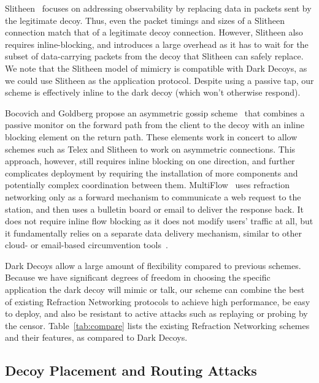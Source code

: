 Slitheen~\cite{slitheen16} focuses on addressing observability by replacing
data in packets sent by the legitimate decoy. Thus, even the packet timings and
sizes of a Slitheen connection match that of a legitimate decoy connection.
However, Slitheen also requires inline-blocking, and introduces a large overhead
as it has to wait for the subset of data-carrying packets from the decoy that
Slitheen can safely replace. We note that the Slitheen model of mimicry is
compatible with Dark Decoys, as we could use Slitheen as the application
protocol. Despite using a passive tap, our scheme is effectively inline to the
dark decoy (which won't otherwise respond).


Bocovich and Goldberg propose an asymmetric gossip scheme~\cite{secureasymmetry} that combines a passive monitor on the forward path from the client to the decoy with an inline blocking element on the return path. These elements work in concert to allow schemes such as Telex and Slitheen to work on asymmetric connections. This approach, however, still requires inline blocking on one direction, and further complicates deployment by requiring the installation of more components and potentially complex coordination between them. MultiFlow~\cite{multiflow} uses refraction networking only as a forward mechanism to communicate a web request to the station, and then uses a bulletin board or email to deliver the response back. It does not require inline flow blocking as it does not modify users' traffic at all, but it fundamentally relies on a separate data delivery mechanism, similar to other cloud- or email-based circumvention tools~\cite{SWEET-ToN,CloudTransport}.

Dark Decoys allow a large amount of flexibility compared to previous schemes.
Because we have significant degrees of freedom in choosing the specific
application the dark decoy will mimic or talk, our scheme can combine the best
of existing Refraction Networking protocols to achieve high performance, be easy
to deploy, and
also be resistant to active attacks such as replaying or probing by the censor.
Table~\ref{tab:compare} lists the existing Refraction Networking schemes and
their features, as compared to Dark Decoys.

\TabCompare

\subsection{Decoy Placement and Routing Attacks}

